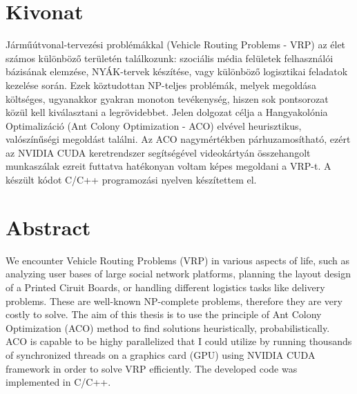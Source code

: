 \setcounter{page}{1}

\selecthungarian

\chapter*{Kivonat}

Járműútvonal-tervezési problémákkal (Vehicle Routing Problems - VRP) az élet számos különböző területén találkozunk: szociális média felületek felhasználói bázisának elemzése, NYÁK-tervek készítése, vagy különböző logisztikai feladatok kezelése során. Ezek köztudottan NP-teljes problémák, melyek megoldása költséges, ugyanakkor gyakran monoton tevékenység, hiszen sok pontsorozat közül kell kiválasztani a legrövidebbet. Jelen dolgozat célja a Hangyakolónia Optimalizáció (Ant Colony Optimization - ACO) elvével heurisztikus, valószínűségi megoldást találni. Az ACO nagymértékben párhuzamosítható, ezért az NVIDIA CUDA keretrendszer segítségével videokártyán összehangolt munkaszálak ezreit futtatva hatékonyan voltam képes megoldani a VRP-t. A készült kódot C/C++ programozási nyelven készítettem el.

\vfill
\selectenglish



\chapter*{Abstract}

We encounter Vehicle Routing Problems (VRP) in various aspects of life, such as analyzing user bases of large social network platforms, planning the layout design of a Printed Ciruit Boards, or handling different logistics tasks like delivery problems. These are well-known NP-complete problems, therefore they are very costly to solve. The aim of this thesis is to use the principle of Ant Colony Optimization (ACO) method to find solutions heuristically, probabilistically. ACO is capable to be highy parallelized that I could utilize by running thousands of synchronized threads on a graphics card (GPU) using NVIDIA CUDA framework in order to solve VRP efficiently. The developed code was implemented in C/C++.


\vfill
\selectthesislanguage

\setcounter{romanPage}{\value{page}}
